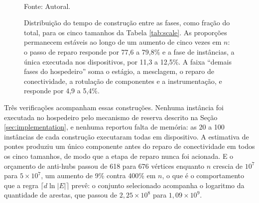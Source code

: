 \begin{figure}[htb!]
\centering
\caption{\label{fig:phases} Distribuição do tempo de construção entre as fases, como fração do total, para os cinco tamanhos da Tabela \ref{tab:scale}. As proporções permanecem estáveis ao longo de um aumento de cinco vezes em $n$: o passo de reparo responde por 77,6 a 79,8\% e a fase de instâncias, a única executada nos dispositivos, por 11,3 a 12,5\%. A faixa ``demais fases do hospedeiro'' soma o estágio, a mesclagem, o reparo de conectividade, a rotulação de componentes e a instrumentação, e responde por 4,9 a 5,4\%.}
\\
Fonte: Autoral.
\end{figure}


Três verificações acompanham essas construções. Nenhuma instância foi executada no hospedeiro pelo mecanismo de reserva descrito na Seção \ref{sec:implementation}, e nenhuma reportou falta de memória: as 20 a 100 instâncias de cada construção executaram todas em dispositivo. A estimativa de pontes produziu um único componente antes do reparo de conectividade em todos os cinco tamanhos, de modo que a etapa de reparo nunca foi acionada. E o orçamento de anti-hubs passou de 618 para 676 vértices enquanto $n$ crescia de $10^7$ para $5 \times 10^7$, um aumento de 9\% contra 400\% em $n$, o que é o comportamento que a regra $\lceil d \ln |E| \rceil$ prevê: o conjunto selecionado acompanha o logaritmo da quantidade de arestas, que passou de $2{,}25 \times 10^8$ para $1{,}09 \times 10^9$.\\

